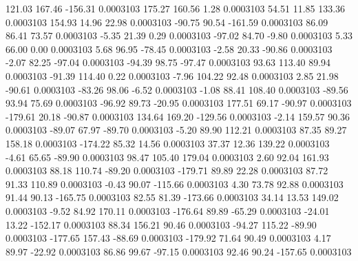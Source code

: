       121.03      167.46     -156.31     0.0003103
      175.27      160.56        1.28     0.0003103
       54.51       11.85      133.36     0.0003103
      154.93       14.96       22.98     0.0003103
      -90.75       90.54     -161.59     0.0003103
       86.09       86.41       73.57     0.0003103
       -5.35       21.39        0.29     0.0003103
      -97.02       84.70       -9.80     0.0003103
        5.33       66.00        0.00     0.0003103
        5.68       96.95      -78.45     0.0003103
       -2.58       20.33      -90.86     0.0003103
       -2.07       82.25      -97.04     0.0003103
      -94.39       98.75      -97.47     0.0003103
       93.63      113.40       89.94     0.0003103
      -91.39      114.40        0.22     0.0003103
       -7.96      104.22       92.48     0.0003103
        2.85       21.98      -90.61     0.0003103
      -83.26       98.06       -6.52     0.0003103
       -1.08       88.41      108.40     0.0003103
      -89.56       93.94       75.69     0.0003103
      -96.92       89.73      -20.95     0.0003103
      177.51       69.17      -90.97     0.0003103
     -179.61       20.18      -90.87     0.0003103
      134.64      169.20     -129.56     0.0003103
       -2.14      159.57       90.36     0.0003103
      -89.07       67.97      -89.70     0.0003103
       -5.20       89.90      112.21     0.0003103
       87.35       89.27      158.18     0.0003103
     -174.22       85.32       14.56     0.0003103
       37.37       12.36      139.22     0.0003103
       -4.61       65.65      -89.90     0.0003103
       98.47      105.40      179.04     0.0003103
        2.60       92.04      161.93     0.0003103
       88.18      110.74      -89.20     0.0003103
     -179.71       89.89       22.28     0.0003103
       87.72       91.33      110.89     0.0003103
       -0.43       90.07     -115.66     0.0003103
        4.30       73.78       92.88     0.0003103
       91.44       90.13     -165.75     0.0003103
       82.55       81.39     -173.66     0.0003103
       34.14       13.53      149.02     0.0003103
       -9.52       84.92      170.11     0.0003103
     -176.64       89.89      -65.29     0.0003103
      -24.01       13.22     -152.17     0.0003103
       88.34      156.21       90.46     0.0003103
      -94.27      115.22      -89.90     0.0003103
     -177.65      157.43      -88.69     0.0003103
     -179.92       71.64       90.49     0.0003103
        4.17       89.97      -22.92     0.0003103
       86.86       99.67      -97.15     0.0003103
       92.46       90.24     -157.65     0.0003103
